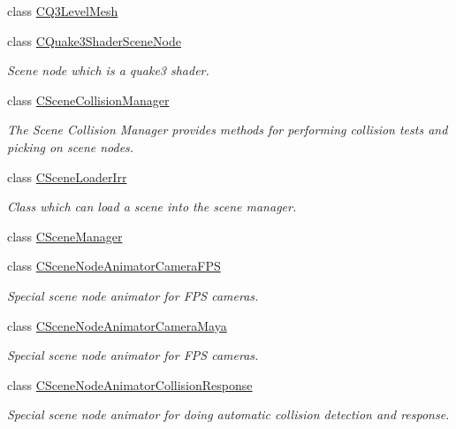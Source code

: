 \begin{DoxyCompactItemize}
class \hyperlink{classirr_1_1scene_1_1_c_q3_level_mesh}{C\-Q3\-Level\-Mesh}
\item 
class \hyperlink{classirr_1_1scene_1_1_c_quake3_shader_scene_node}{C\-Quake3\-Shader\-Scene\-Node}
\begin{DoxyCompactList}\small\item\em Scene node which is a quake3 shader. \end{DoxyCompactList}\item 
class \hyperlink{classirr_1_1scene_1_1_c_scene_collision_manager}{C\-Scene\-Collision\-Manager}
\begin{DoxyCompactList}\small\item\em The Scene Collision Manager provides methods for performing collision tests and picking on scene nodes. \end{DoxyCompactList}\item 
class \hyperlink{classirr_1_1scene_1_1_c_scene_loader_irr}{C\-Scene\-Loader\-Irr}
\begin{DoxyCompactList}\small\item\em Class which can load a scene into the scene manager. \end{DoxyCompactList}\item 
class \hyperlink{classirr_1_1scene_1_1_c_scene_manager}{C\-Scene\-Manager}
\item 
class \hyperlink{classirr_1_1scene_1_1_c_scene_node_animator_camera_f_p_s}{C\-Scene\-Node\-Animator\-Camera\-F\-P\-S}
\begin{DoxyCompactList}\small\item\em Special scene node animator for F\-P\-S cameras. \end{DoxyCompactList}\item 
class \hyperlink{classirr_1_1scene_1_1_c_scene_node_animator_camera_maya}{C\-Scene\-Node\-Animator\-Camera\-Maya}
\begin{DoxyCompactList}\small\item\em Special scene node animator for F\-P\-S cameras. \end{DoxyCompactList}\item 
class \hyperlink{classirr_1_1scene_1_1_c_scene_node_animator_collision_response}{C\-Scene\-Node\-Animator\-Collision\-Response}
\begin{DoxyCompactList}\small\item\em Special scene node animator for doing automatic collision detection and response. \end{DoxyCompactList}\item 

\end{DoxyCompactItemize}
